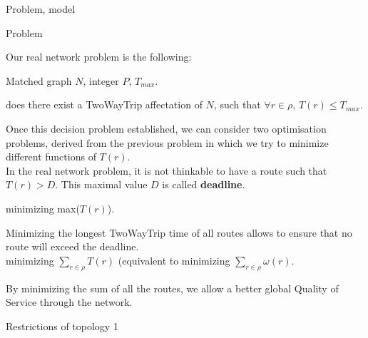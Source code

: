 \documentclass[a4paper,10pt]{report}
\begin{document}
\begin{chapter}{Problem, model}
\begin{section}{Problem}


Our real network problem is the following:\\


 Matched graph $N$, integer $P$, $ T_{max}$.

 does there exist a TwoWayTrip affectation of $N$, such that $\forall r \in \rho$, $T(r) \le T_{max}$.

Once this decision problem established, we can consider two optimisation problems, derived from the previous problem in which
we try to minimize different functions of $T(r)$.\\

In the real network problem, it is not thinkable to have a route such that $T(r) > D$. This maximal value $D$ is called {\bf deadline}.

 minimizing max($T(r)$).

Minimizing the longest TwoWayTrip time of all routes allows to ensure that no route will exceed the deadline.\\

 minimizing $\sum_{r \in \rho}  T(r)$ (equivalent to minimizing $\sum_{r \in \rho}  \omega(r)$.

By minimizing the sum of all the routes, we allow a better global Quality of Service through the network.\\
\begin{subsection}{Restrictions of topology 1}
\\



\end{subsection}
\end{section}
\end{chapter}
\end{document}
